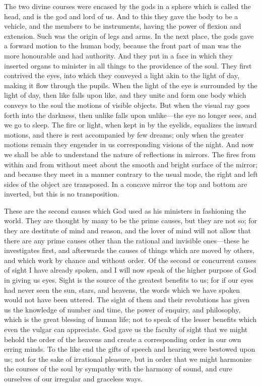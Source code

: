 The two divine courses were encased by the gods in a sphere which is
called the head, and is the god and lord of us. And to this they gave the
body to be a vehicle, and the members to be instruments, having the power
of flexion and extension. Such was the origin of legs and arms. In the
next place, the gods gave a forward motion to the human body, because the
front part of man was the more honourable and had authority. And they put
in a face in which they inserted organs to minister in all things to the
providence of the soul. They first contrived the eyes, into which they
conveyed a light akin to the light of day, making it flow through the
pupils. When the light of the eye is surrounded by the light of day, then
like falls upon like, and they unite and form one body which conveys to
the soul the motions of visible objects. But when the visual ray goes
forth into the darkness, then unlike falls upon unlike—the eye no
longer sees, and we go to sleep. The fire or light, when kept in by the
eyelids, equalizes the inward motions, and there is rest accompanied by
few dreams; only when the greater motions remain they engender in us
corresponding visions of the night. And now we shall be able to understand
the nature of reflections in mirrors. The fires from within and from
without meet about the smooth and bright surface of the mirror; and
because they meet in a manner contrary to the usual mode, the right and
left sides of the object are transposed. In a concave mirror the top and
bottom are inverted, but this is no transposition.

These are the second causes which God used as his ministers in fashioning
the world. They are thought by many to be the prime causes, but they are
not so; for they are destitute of mind and reason, and the lover of mind
will not allow that there are any prime causes other than the rational and
invisible ones—these he investigates first, and afterwards the
causes of things which are moved by others, and which work by chance and
without order. Of the second or concurrent causes of sight I have already
spoken, and I will now speak of the higher purpose of God in giving us
eyes. Sight is the source of the greatest benefits to us; for if our eyes
had never seen the sun, stars, and heavens, the words which we have spoken
would not have been uttered. The sight of them and their revolutions has
given us the knowledge of number and time, the power of enquiry, and
philosophy, which is the great blessing of human life; not to speak of the
lesser benefits which even the vulgar can appreciate. God gave us the
faculty of sight that we might behold the order of the heavens and create
a corresponding order in our own erring minds. To the like end the gifts
of speech and hearing were bestowed upon us; not for the sake of
irrational pleasure, but in order that we might harmonize the courses of
the soul by sympathy with the harmony of sound, and cure ourselves of our
irregular and graceless ways.

